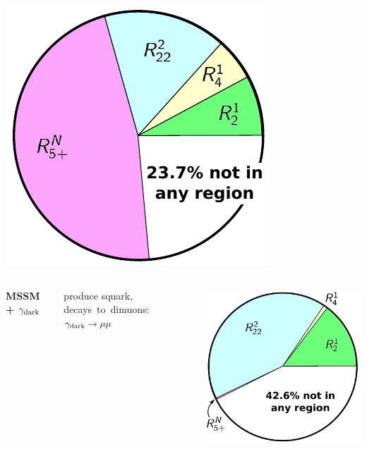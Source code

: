 \documentclass[compress]{beamer}
\newcommand{\s}[1]{{\mbox{\scriptsize #1}}}
\begin{document}
\begin{frame}
\begin{columns}
\includegraphics[width=\linewidth]{pie_u1.pdf}
\end{columns}

\vspace{0.25 cm}
\begin{columns}
{\bf MSSM + $\gamma_\s{dark}$}

produce squark, \mbox{decays to dimuons:\hspace{-0.25 cm}} $\gamma_\s{dark} \to \mu\mu$

\includegraphics[width=\linewidth]{pie_gammadark.pdf}


\end{columns}
\end{frame}
\end{document}
